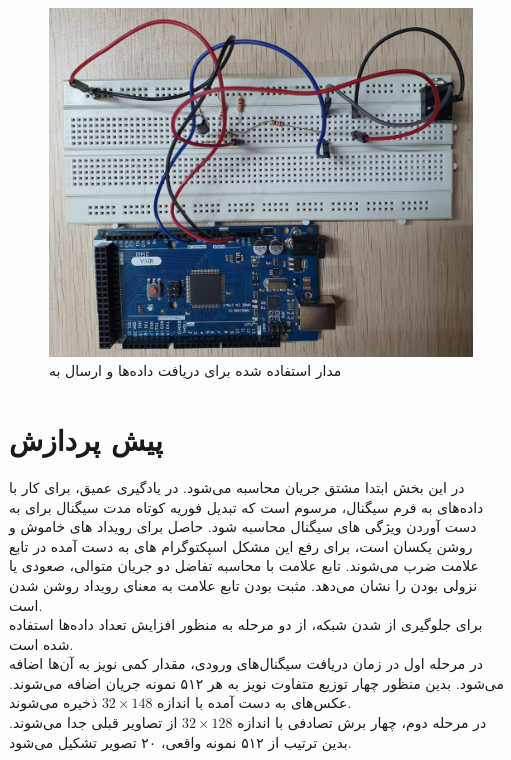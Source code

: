 \documentclass[12pt,onecolumn,a4paper]{article}
\begin{document}
\begin{figure}
	\centering
	\includegraphics[totalheight=8cm]{Images/1.jpg}
	\caption{مدار استفاده شده برای دریافت داده‌ها و ارسال به }
	\label{fig:verticalcell}
\end{figure}

\section{پیش پردازش}
در این بخش ابتدا مشتق جریان  محاسبه می‌شود. در یادگیری عمیق، برای کار با داده‌های به فرم سیگنال، مرسوم است که تبدیل فوریه کوتاه مدت سیگنال برای به دست آوردن ویژگی های سیگنال محاسبه شود. 
حاصل برای رویداد های خاموش و روشن یکسان است، برای رفع این مشکل اسپکتوگرام های به دست آمده در تابع علامت ضرب می‌شوند. تابع علامت با محاسبه تفاضل دو جریان  متوالی، صعودی یا نزولی بودن را نشان می‌دهد. مثبت بودن تابع علامت به معنای رویداد روشن شدن است.\\
برای جلوگیری از 
شدن شبکه، از دو مرحله 
به منظور افزایش تعداد داده‌ها استفاده شده است. \\
در مرحله اول در زمان دریافت سیگنال‌‌های ورودی، مقدار کمی نویز به آن‌ها اضافه می‌شود. بدین منظور چهار توزیع متفاوت نویز به هر ۵۱۲ نمونه جریان  اضافه می‌شوند. عکس‌های به دست آمده با اندازه
$32 \times 148$
ذخیره می‌شوند.
\\
در مرحله دوم، چهار برش تصادفی با اندازه 
$32 \times 128$
از تصاویر قبلی جدا می‌شوند. بدین ترتیب از ۵۱۲ نمونه واقعی، ۲۰ تصویر تشکیل می‌شود.
\end{document}
